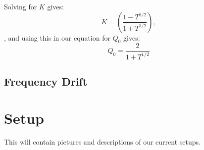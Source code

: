 \documentclass[reprint]{revtex4-1}
\begin{document}
Solving for $K$ gives:
\[
K = \left( \frac{1-T^{1/2}}{1+T^{1/2}}\right),
\],
and using this in our equation for $Q_0$ gives:
\begin{equation}
\label{eq:qnought}
Q_0 = \frac{2}{1+T^{1/2}}
\end{equation}
\subsection*{Frequency Drift}

\section*{Setup}
This will contain pictures and descriptions of our current 
setups.


\end{document}
